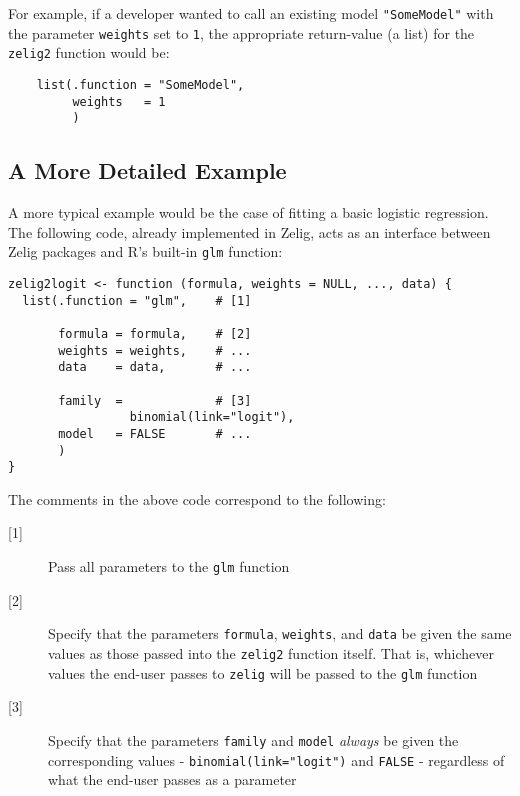 \documentclass{article}
\newcommand{\code}[1]{{\tt #1}}
\begin{document}
\noindent For example, if a developer wanted to call an existing model
\code{"SomeModel"} with the parameter \code{weights} set to \code{1},
the appropriate return-value (a list) for the \code{zelig2} function would be:


\begin{verbatim}
    list(.function = "SomeModel",
         weights   = 1
         )
\end{verbatim}


\subsection{A More Detailed Example}

\noindent A more typical example would be the case of fitting a basic logistic
regression. The following code, already implemented in Zelig, acts as an
interface between Zelig packages and R's built-in \code{glm} function:


\begin{verbatim}
zelig2logit <- function (formula, weights = NULL, ..., data) {
  list(.function = "glm",    # [1]
       
       formula = formula,    # [2]
       weights = weights,    # ...
       data    = data,       # ...

       family  =             # [3]
                 binomial(link="logit"),
       model   = FALSE       # ...
       )
}
\end{verbatim}

\noindent The comments in the above code correspond to the following:

\begin{description}
	\item[{[1]}] Pass all parameters to the \code{glm} function

	\item[{[2]}] Specify that the parameters \code{formula}, \code{weights}, and \code{data} be given the same values as those passed into the \code{zelig2} function itself. That is, whichever values the end-user passes to \code{zelig} will be passed to the \code{glm} function

	\item[{[3]}] Specify that the parameters \code{family} and \code{model} \emph{always} be given the corresponding values - \code{binomial(link="logit")} and \code{FALSE} - regardless of what the end-user passes as a parameter
	
\end{description}
\end{document}
